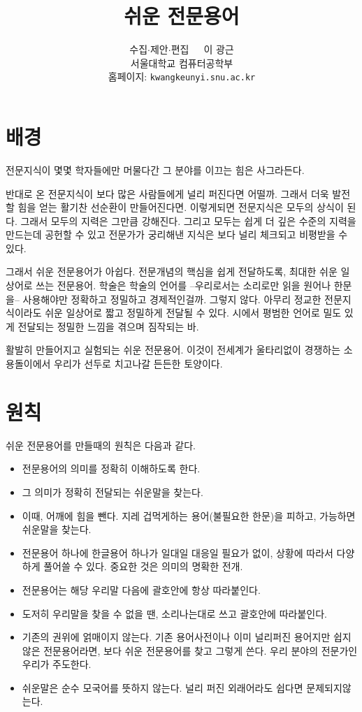 \documentclass[11pt]{article}
\title{쉬운 전문용어}
\author{수집\(\cdot\)제안\(\cdot\)편집\ \ \  이 광근\\
  서울대학교 컴퓨터공학부\\
  홈페이지: \texttt{kwangkeunyi.snu.ac.kr}
}
\date{}
\begin{document}
\maketitle

\section*{배경}
전문지식이 몇몇 학자들에만 머물다간 그 분야를 이끄는 힘은 사그라든다. 

반대로 온 전문지식이 보다 많은 사람들에게 널리 퍼진다면 어떨까. 그래서
더욱 발전할 힘을 얻는 활기찬 선순환이 만들어진다면. 이렇게되면
전문지식은 모두의 상식이 된다. 그래서 모두의 지력은 그만큼
강해진다. 그리고 모두는 쉽게 더 깊은 수준의 지력을 만드는데 공헌할 수
있고 전문가가 궁리해낸 지식은 보다 널리 체크되고 비평받을 수 있다.

그래서 쉬운 전문용어가 아쉽다. 전문개념의 핵심을 쉽게 전달하도록,
최대한 쉬운 일상어로 쓰는 전문용어. 학술은 학술의 언어를
--우리로서는 소리로만 읽을 원어나 한문을-- 사용해야만 정확하고
정밀하고 경제적인걸까. 그렇지 않다. 아무리 정교한 전문지식이라도 쉬운
일상어로 짧고 정밀하게 전달될 수 있다. 시에서 평범한 언어로 밀도 있게
전달되는 정밀한 느낌을 겪으며 짐작되는 바.

활발히 만들어지고 실험되는 쉬운 전문용어. 이것이 전세계가 울타리없이
경쟁하는 소용돌이에서 우리가 선두로 치고나갈 든든한 토양이다.

\section*{원칙}
쉬운 전문용어를 만들때의 원칙은 다음과 같다.
\begin{itemize}
\item 전문용어의 의미를 정확히 이해하도록 한다.
\item 그 의미가 정확히 전달되는 쉬운말을 찾는다.
\item 이때, 어깨에 힘을 뺀다. 지레 겁먹게하는 용어(불필요한 한문)을 피하고, 가능하면
  쉬운말을 찾는다. 
\item 전문용어 하나에 한글용어 하나가 일대일 대응일 필요가 없이,
  상황에 따라서 다양하게 풀어쓸 수 있다. 중요한 것은 의미의 명확한
  전개.
\item 전문용어는 해당 우리말 다음에 괄호안에 항상 따라붙인다.
\item 도저히 우리말을 찾을 수 없을 땐, 소리나는대로 쓰고 괄호안에
  따라붙인다. 
\item 기존의 권위에 얽매이지 않는다. 기존 용어사전이나 이미 널리퍼진
  용어지만 쉽지않은 전문용어라면, 보다 쉬운 전문용어를 찾고 그렇게
  쓴다. 우리 분야의 전문가인 우리가 주도한다.
\item 쉬운말은 순수 모국어를 뜻하지 않는다. 널리 퍼진 외래어라도
  쉽다면 문제되지않는다.
\end{itemize}



\printindex
\end{document}
